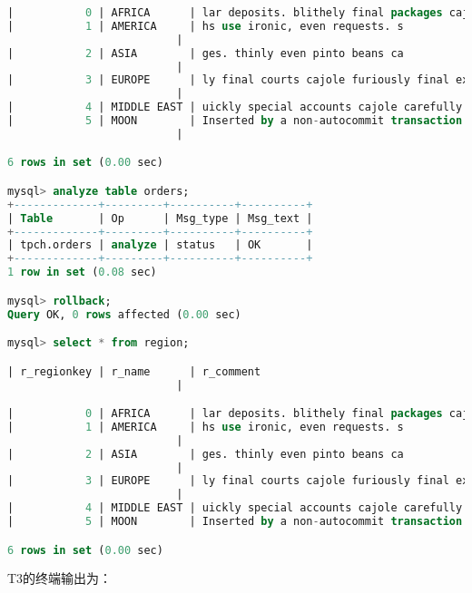 \documentclass{article}
\begin{document}
\begin{lstlisting}[language=sql]
|           0 | AFRICA      | lar deposits. blithely final packages cajole. regular waters are final requests. regular accounts are according to  |
|           1 | AMERICA     | hs use ironic, even requests. s
                          |
|           2 | ASIA        | ges. thinly even pinto beans ca
                          |
|           3 | EUROPE      | ly final courts cajole furiously final excuse
                          |
|           4 | MIDDLE EAST | uickly special accounts cajole carefully blithely close requests. carefully final asymptotes haggle furiousl        |
|           5 | MOON        | Inserted by a non-autocommit transaction.
                          |

6 rows in set (0.00 sec)

mysql> analyze table orders;
+-------------+---------+----------+----------+
| Table       | Op      | Msg_type | Msg_text |
+-------------+---------+----------+----------+
| tpch.orders | analyze | status   | OK       |
+-------------+---------+----------+----------+
1 row in set (0.08 sec)

mysql> rollback;
Query OK, 0 rows affected (0.00 sec)

mysql> select * from region;

| r_regionkey | r_name      | r_comment
                          |

|           0 | AFRICA      | lar deposits. blithely final packages cajole. regular waters are final requests. regular accounts are according to  |
|           1 | AMERICA     | hs use ironic, even requests. s
                          |
|           2 | ASIA        | ges. thinly even pinto beans ca
                          |
|           3 | EUROPE      | ly final courts cajole furiously final excuse
                          |
|           4 | MIDDLE EAST | uickly special accounts cajole carefully blithely close requests. carefully final asymptotes haggle furiousl        |
|           5 | MOON        | Inserted by a non-autocommit transaction.

6 rows in set (0.00 sec)
\end{lstlisting}

T3的终端输出为：
\end{document}
